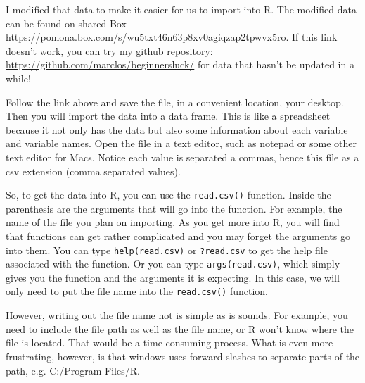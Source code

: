 \documentclass{tufte-handout}\usepackage[]{graphicx}\usepackage[]{color}
\begin{document}
I modified that data to make it easier for us to import into R. The modified data can be found on shared Box \url{https://pomona.box.com/s/wu5txt46n63p8xv0agiqzap2tpwvx5ro}. If this link doesn't work, you can try my github repository: \url{https://github.com/marclos/beginnersluck/} for data that hasn't be updated in a while!



Follow the link above and save the file, in a convenient location, \eg your desktop. Then you will import the data into a data frame. This is like a spreadsheet because it not only has the data but also some information about each variable and variable names. Open the file in a text editor, such as notepad or some other text editor for Macs. Notice each value is separated a commas, hence this file as a csv extension (\ie comma separated values). 

So, to get the data into R, you can use the \texttt{read.csv()} function. Inside the parenthesis are the arguments that will go into the function. For example, the name of the file you plan on importing. As you get more into R, you will find that functions can get rather complicated and you may forget the arguments go into them. You can type \texttt{help(read.csv)} or \texttt{?read.csv} to get the help file associated with the function. Or you can type \texttt{args(read.csv)}, which simply gives you the function and the arguments it is expecting. In this case, we will only need to put the file name into the \texttt{read.csv()} function. 

However, writing out the file name not is simple as is sounds. For example, you need to include the file path as well as the file name, or R won't know where the file is located. That would be a time consuming process. What is even more frustrating, however, is that windows uses forward slashes to separate parts of the path, e.g. C:/Program Files/R.
\end{document}
